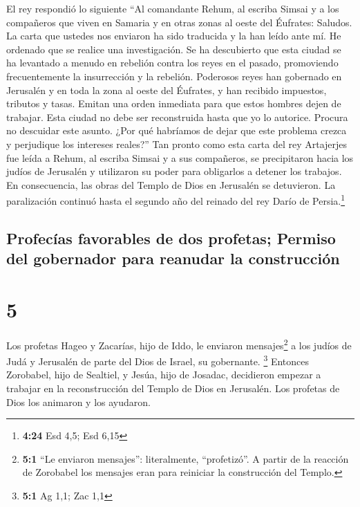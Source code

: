  El rey respondió lo siguiente ``Al comandante Rehum, al
escriba Simsai y a los compañeros que viven en Samaria y en otras zonas
al oeste del Éufrates: Saludos.  La carta que ustedes nos
enviaron ha sido traducida y la han leído ante mí.  He
ordenado que se realice una investigación. Se ha descubierto que esta
ciudad se ha levantado a menudo en rebelión contra los reyes en el
pasado, promoviendo frecuentemente la insurrección y la rebelión.
 Poderosos reyes han gobernado en Jerusalén y en toda la
zona al oeste del Éufrates, y han recibido impuestos, tributos y tasas.
 Emitan una orden inmediata para que estos hombres dejen
de trabajar. Esta ciudad no debe ser reconstruida hasta que yo lo
autorice.  Procura no descuidar este asunto. ¿Por qué
habríamos de dejar que este problema crezca y perjudique los intereses
reales?''  Tan pronto como esta carta del rey Artajerjes
fue leída a Rehum, al escriba Simsai y a sus compañeros, se precipitaron
hacia los judíos de Jerusalén y utilizaron su poder para obligarlos a
detener los trabajos.  En consecuencia, las obras del
Templo de Dios en Jerusalén se detuvieron. La paralización continuó
hasta el segundo año del reinado del rey Darío de Persia.\footnote{\textbf{4:24}
  Esd 4,5; Esd 6,15}

\hypertarget{profecuxedas-favorables-de-dos-profetas-permiso-del-gobernador-para-reanudar-la-construcciuxf3n}{%
\subsection{Profecías favorables de dos profetas; Permiso del gobernador
para reanudar la
construcción}\label{profecuxedas-favorables-de-dos-profetas-permiso-del-gobernador-para-reanudar-la-construcciuxf3n}}

\hypertarget{section-4}{%
\section{5}\label{section-4}}

 Los profetas Hageo y Zacarías, hijo de Iddo, le enviaron
mensajes\footnote{\textbf{5:1} ``Le enviaron mensajes'': literalmente,
  ``profetizó''. A partir de la reacción de Zorobabel los mensajes eran
  para reiniciar la construcción del Templo.} a los judíos de Judá y
Jerusalén de parte del Dios de Israel, su gobernante. \footnote{\textbf{5:1}
  Ag 1,1; Zac 1,1}  Entonces Zorobabel, hijo de Sealtiel,
y Jesúa, hijo de Josadac, decidieron empezar a trabajar en la
reconstrucción del Templo de Dios en Jerusalén. Los profetas de Dios los
animaron y los ayudaron.


